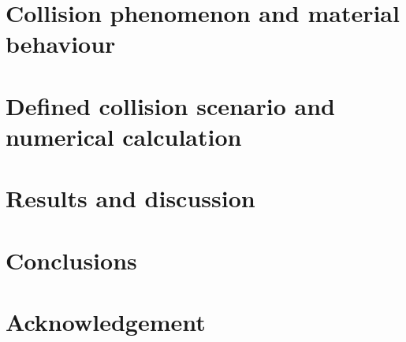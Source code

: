 \documentclass[10pt,journal]{IEEEtran}
\begin{document}

\section{Collision phenomenon and material behaviour}






\section{Defined collision scenario and numerical calculation}





\section{Results and discussion}





\section{Conclusions}






\section*{Acknowledgement} 






\end{document}
